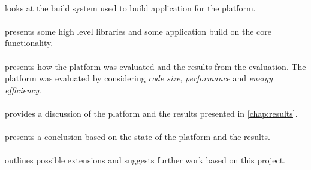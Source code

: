 \paragraph{} looks at the build system used to build application for the {\rg} platform.

\paragraph{} presents some high level libraries and some application build on the core {\rg} functionality.

\paragraph{} presents how the platform was evaluated and the results from the evaluation.
The platform was evaluated by considering \emph{code size}, \emph{performance} and \emph{energy efficiency}.

\paragraph{} provides a discussion of the platform and the results presented in \autoref{chap:results}.

\paragraph{} presents a conclusion based on the state of the platform and the results.

\paragraph{} outlines possible extensions and suggests further work based on this project.
